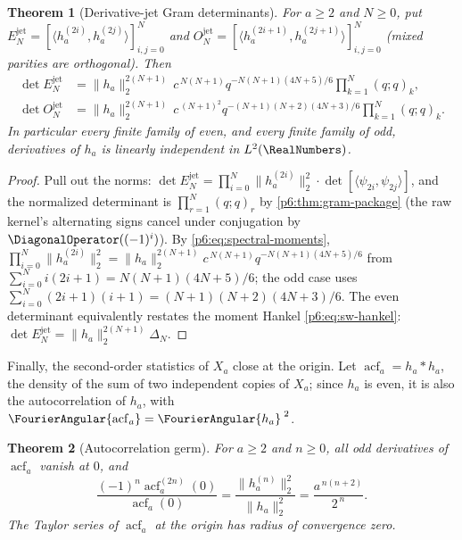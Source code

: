 \documentclass[11pt,oneside]{article}
\numberwithin{equation}{section}
\newtheorem{theorem}{Theorem}[section]
\theoremstyle{definition}
\theoremstyle{remark}
\begin{document}
\begin{theorem}[Derivative-jet Gram determinants]\label{p6:thm:jet-gram}
For $a\ge2$ and $N\ge0$, put
$E_N^{\mathrm{jet}}=[\langle h_a^{(2i)},h_a^{(2j)}\rangle]_{i,j=0}^{N}$ and
$O_N^{\mathrm{jet}}=[\langle h_a^{(2i+1)},h_a^{(2j+1)}\rangle]_{i,j=0}^{N}$
(mixed parities are orthogonal).  Then
\begin{align}
 \det E_N^{\mathrm{jet}}
 &=\|h_a\|_2^{2(N+1)}\,c^{\,N(N+1)}q^{-N(N+1)(4N+5)/6}
 \prod_{k=1}^{N}(q;q)_k,
 \label{p6:eq:jet-gram-even}\\
 \det O_N^{\mathrm{jet}}
 &=\|h_a\|_2^{2(N+1)}\,c^{\,(N+1)^2}q^{-(N+1)(N+2)(4N+3)/6}
 \prod_{k=1}^{N}(q;q)_k.
 \label{p6:eq:jet-gram-odd}
\end{align}
In particular every finite family of even, and every finite family of odd,
derivatives of $h_a$ is linearly independent in $L^2(\RealNumbers)$.
\end{theorem}

\begin{proof}
Pull out the norms:
$\det E_N^{\mathrm{jet}}
=\prod_{i=0}^{N}\|h_a^{(2i)}\|_2^2\cdot
\det[\langle\psi_{2i},\psi_{2j}\rangle]$, and the normalized determinant is
$\prod_{r=1}^{N}(q;q)_r$ by \cref{p6:thm:gram-package} (the raw kernel's
alternating signs cancel under conjugation by
$\DiagonalOperator((-1)^i)$).  By \eqref{p6:eq:spectral-moments},
$\prod_{i=0}^{N}\|h_a^{(2i)}\|_2^2
=\|h_a\|_2^{2(N+1)}c^{\,N(N+1)}q^{-N(N+1)(4N+5)/6}$ from
$\sum_{i=0}^{N}i(2i+1)=N(N+1)(4N+5)/6$; the odd case uses
$\sum_{i=0}^{N}(2i+1)(i+1)=(N+1)(N+2)(4N+3)/6$.  The even determinant
equivalently restates the moment Hankel \eqref{p6:eq:sw-hankel}:
$\det E_N^{\mathrm{jet}}=\|h_a\|_2^{2(N+1)}\Delta_N$.
\end{proof}

Finally, the second-order statistics of $X_a$ close at the origin.  Let
$\operatorname{acf}_a=h_a*h_a$, the density of the sum of two independent
copies of $X_a$; since $h_a$ is even, it is also the autocorrelation of
$h_a$, with $\FourierAngular{\operatorname{acf}_a}=\FourierAngular{h_a}^{\;2}$.

\begin{theorem}[Autocorrelation germ]\label{p6:thm:acf-germ}
For $a\ge2$ and $n\ge0$, all odd derivatives of $\operatorname{acf}_a$
vanish at $0$, and
\begin{equation}\label{p6:eq:acf-germ}
 \boxed{\ \frac{(-1)^n\operatorname{acf}_a^{(2n)}(0)}
 {\operatorname{acf}_a(0)}
 =\frac{\|h_a^{(n)}\|_2^2}{\|h_a\|_2^2}
 =\frac{a^{\,n(n+2)}}{2^{\,n}}.\ }
\end{equation}
The Taylor series of $\operatorname{acf}_a$ at the origin has radius of
convergence zero.
\end{theorem}
\end{document}
